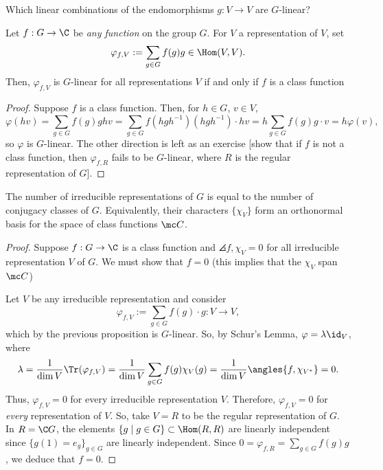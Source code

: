 \begin{notebox*}[Question]
    Which linear combinations of the endomorphisms $g:V \to V$ are $G$-linear?
\end{notebox*}

\begin{prop}
    Let $f:G \to \C$ be \textit{any function} on the group $G$. For $V$ a representation of $V$, set
    $$\varphi_{f,V}:= \sum_{g \in G}f(g)g \in \Hom (V,V).$$
    Then, $\varphi_{f,V}$ is $G$-linear for all representations $V$ if and only if $f$ is a class function
\end{prop}

\begin{proof}
    Suppose $f$ is a class function. Then, for $h \in G$, $v \in V$,
    $$\varphi(hv)=\sum_{g \in G}f(g)ghv=\sum_{g \in G}f(hgh^{-1})(hgh^{-1})\cdot hv=h\sum_{g \in G}f(g)g\cdot v=h\varphi(v),$$
    so $\varphi$ is $G$-linear. The other direction is left as an exercise [show that if $f$ is not a class function, then $\varphi_{f,R}$ fails to be $G$-linear, where $R$ is the regular representation of $G$].
\end{proof}

\begin{thm}[][label=thm:conjchar]
    The number of irreducible representations of $G$ is equal to the number of conjugacy classes of $G$. Equivalently, their characters $\{\chi_V\}$ form an orthonormal basis for the space of class functions $\mc C$.
\end{thm}

\begin{proof}
Suppose $f :G \to \C$ is a class function and $\angles{f,\chi _V}=0$ for all irreducible representation $V$ of $G$. We must show that $f=0$ (this implies that the $\chi_V$ span $\mc C$)

Let $V$ be any irreducible representation and consider
$$\varphi_{f,V}:=\sum_{g \in G}f(g)\cdot g: V \to V,$$
which by the previous proposition is $G$-linear. So, by Schur's Lemma, $\varphi = \lambda \id _V$, where
$$\lambda = \frac{1}{\dim V}\Tr (\varphi_{f,V}) = \frac{1}{\dim V}\sum_{g \in G}f(g) \chi_V(g)=\frac{1}{\dim V}\angles{f,\chi_{V^*}}=0.$$
Thus, $\varphi _{f,V}=0$ for every irreducible representation $V$. Therefore, $\varphi_{f,V}=0$ for \textit{every} representation of $V$. So, take $V=R$ to be the regular representation of $G$. In $R = \C G$, the elements $\{ g \mid g \in G\} \subset \Hom(R,R)$ are linearly independent since $\{g(1)=e_g\}_{g \in G}$ are linearly independent. Since $0=\varphi_{f,R}=\sum_{g \in G}f(g)g$, we deduce that $f=0$.
\end{proof}

